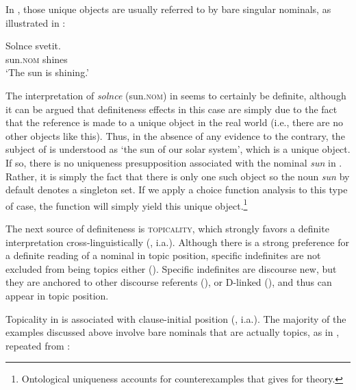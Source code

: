 \documentclass[output=paper]{langscibook}
\begin{document}
In , those unique objects are usually referred to by bare singular nominals, as illustrated in :

\ea \label{ex:seres:31}
\gll	Solnce		svetit.\\
		sun.\textsc{nom}		shines\\
\glt `The sun is shining.'
\z


\noindent The interpretation of \textit{solnce} (sun.\textsc{nom}) in  seems to certainly be definite, although it can be argued that definiteness effects in this case are simply due to the fact that the reference is made to a unique object in the real world (i.e., there are no other objects like this). Thus, in the absence of any evidence to the contrary, the subject of  is understood as `the sun of our solar system', which is a unique object. If so, there is no uniqueness presupposition associated with the nominal \textit{sun} in . Rather, it is simply the fact that there is only one such object so the noun \textit{sun} by default denotes a singleton set. If we apply a choice function analysis to this type of case, the function will simply yield this unique object.\footnote{Ontological uniqueness accounts for counterexamples that \citet{Dayal2017} gives for  theory.}

The next source of definiteness is \textsc{topicality}, which strongly favors a definite interpretation cross-linguistically (\citealt{Reinhart1981,Erteschik-Shir2007}, i.a.). Although there is a strong preference for a definite reading of a nominal in topic position, specific indefinites are not excluded from being topics either (\citealt{Reinhart1981}). Specific indefinites are discourse new, but they are anchored to other discourse referents (\citealt{Heusinger2002}), or D-linked (\citealt{Pesetsky1987,Dyakonova2009}), and thus can appear in topic position.


Topicality in  is associated with clause-initial position (\citealt{Geist2010, Jasinskaja2016}, i.a.). The majority of the examples discussed above involve bare nominals that are actually topics, as in , repeated from :
\end{document}
